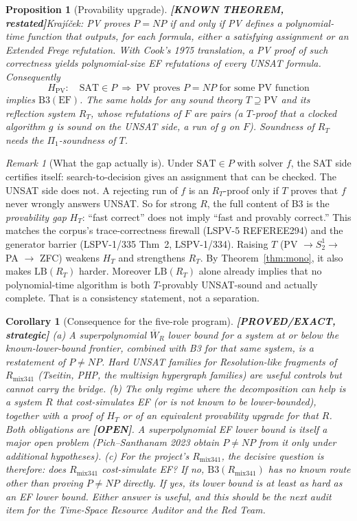 \documentclass[11pt]{article}
\newtheorem{proposition}[theorem]{Proposition}
\newtheorem{corollary}[theorem]{Corollary}
\theoremstyle{definition}
\theoremstyle{remark}
\newtheorem*{remark}{Remark}
\newcommand{\SAT}{\mathrm{SAT}}
\newcommand{\Wb}{\overline W}
\newcommand{\status}[1]{\textbf{[#1]}}
\begin{document}
\begin{proposition}[Provability upgrade]\status{KNOWN THEOREM, restated}\label{prop:pv}
Kraj\'i\v{c}ek: PV proves $P=NP$ if and only if PV defines a polynomial-time function that outputs,
for each formula, either a satisfying assignment or an Extended Frege refutation. With Cook's 1975
translation, a PV proof of such correctness yields polynomial-size EF refutations of every UNSAT
formula. Consequently
\[
H_{\mathrm{PV}}:\quad \SAT\in P\ \Rightarrow\ \text{PV proves } P=NP \text{ for some PV function}
\]
implies $\mathrm{B3}(\mathrm{EF})$. The same holds for any sound theory $T\supseteq\mathrm{PV}$ and its
reflection system $R_T$, whose refutations of $F$ are pairs (a $T$-proof that a clocked algorithm $g$
is sound on the UNSAT side, a run of $g$ on $F$). Soundness of $R_T$ needs the $\Pi_1$-soundness of $T$.
\end{proposition}

\begin{remark}[What the gap actually is]
Under $\SAT\in P$ with solver $f$, the SAT side certifies itself: search-to-decision gives an
assignment that can be checked. The UNSAT side does not. A rejecting run of $f$ is an $R_T$-proof only if
$T$ proves that $f$ never wrongly answers UNSAT. So for strong $R$, the full content of B3 is the
\emph{provability gap} $H_T$: ``fast correct'' does not imply ``fast and provably correct.'' This
matches the corpus's trace-correctness firewall (LSPV-5 REFEREE294) and the generator barrier
(LSPV-1/335 Thm~2, LSPV-1/334). Raising $T$ (PV $\to S^1_2\to$ PA $\to$ ZFC) weakens $H_T$ and
strengthens $R_T$. By Theorem~\ref{thm:mono}, it also makes $\mathrm{LB}(R_T)$ harder.
Moreover $\mathrm{LB}(R_T)$ alone already implies that no polynomial-time algorithm is both
$T$-provably UNSAT-sound and actually complete. That is a consistency statement, not a separation.
\end{remark}

\begin{corollary}[Consequence for the five-role program]\status{PROVED/EXACT, strategic}
(a) A superpolynomial $\Wb_R$ lower bound for a system at or below the known-lower-bound frontier,
combined with B3 for that same system, is a restatement of $P\ne NP$. Hard UNSAT families for
Resolution-like fragments of $R_{\mathrm{mix341}}$ (Tseitin, PHP, the multisign hypergraph
families) are useful controls but cannot carry the bridge.
(b) The only regime where the decomposition can help is a system $R$ that cost-simulates EF (or is
not known to be lower-bounded), together with a proof of $H_T$ or of an equivalent provability
upgrade for that $R$. Both obligations are \status{OPEN}. A superpolynomial EF lower bound is
itself a major open problem (Pich--Santhanam 2023 obtain $P\ne NP$ from it only under additional
hypotheses).
(c) For the project's $R_{\mathrm{mix341}}$, the decisive question is therefore: does $R_{\mathrm{mix341}}$
cost-simulate EF? If no, $\mathrm{B3}(R_{\mathrm{mix341}})$ has no known route other than proving $P\ne NP$ directly.
If yes, its lower bound is at least as hard as an EF lower bound. Either answer is useful, and this
should be the next audit item for the Time-Space Resource Auditor and the Red Team.
\end{corollary}
\end{document}
